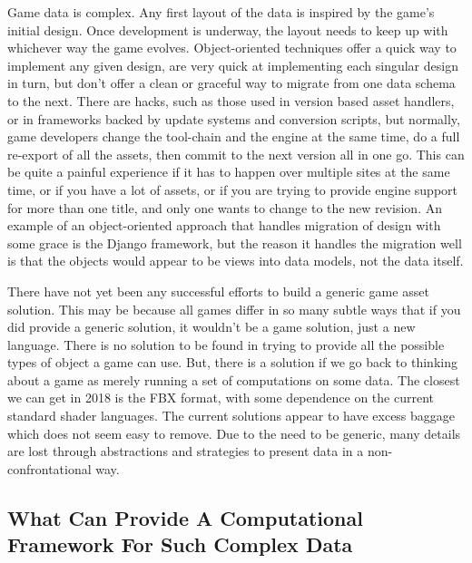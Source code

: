 \documentclass[a4paper,12pt]{article}
\begin{document}
Game data is complex.
Any first layout of the data is inspired by the game's initial design.
Once development is underway, the layout needs to keep up with whichever way the game evolves.
Object-oriented techniques offer a quick way to implement any given design, are very quick at implementing each singular design in turn, but don't offer a clean or graceful way to migrate from one data schema to the next.
There are hacks, such as those used in version based asset handlers, or in frameworks backed by update systems and conversion scripts, but normally, game developers change the tool-chain and the engine at the same time, do a full re-export of all the assets, then commit to the next version all in one go.
This can be quite a painful experience if it has to happen over multiple sites at the same time, or if you have a lot of assets, or if you are trying to provide engine support for more than one title, and only one wants to change to the new revision.
An example of an object-oriented approach that handles migration of design with some grace is the Django framework, but the reason it handles the migration well is that the objects would appear to be views into data models, not the data itself.

There have not yet been any successful efforts to build a generic game asset solution.
This may be because all games differ in so many subtle ways that if you did provide a generic solution, it wouldn't be a game solution, just a new language.
There is no solution to be found in trying to provide all the possible types of object a game can use.
But, there is a solution if we go back to thinking about a game as merely running a set of computations on some data.
The closest we can get in 2018 is the FBX format, with some dependence on the current standard shader languages.
The current solutions appear to have excess baggage which does not seem easy to remove.
Due to the need to be generic, many details are lost through abstractions and strategies to present data in a non-confrontational way.

\subsection{What Can Provide A Computational Framework For Such Complex Data}
\end{document}
